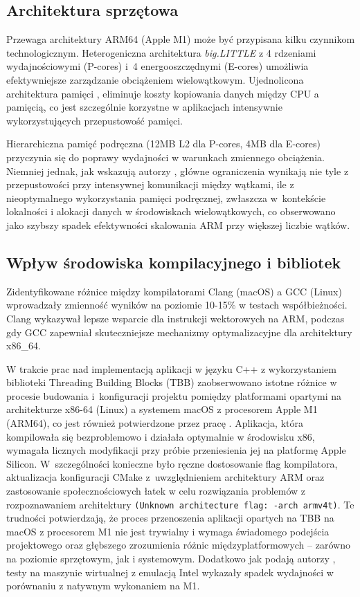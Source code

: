 \subsection{Architektura sprzętowa}

Przewaga architektury ARM64 (Apple M1) może być przypisana kilku czynnikom technologicznym. Heterogeniczna architektura \emph{big.LITTLE} z 4 rdzeniami wydajnościowymi (P-cores) i~4 energooszczędnymi (E-cores) umożliwia efektywniejsze zarządzanie obciążeniem wielowątkowym. Ujednolicona architektura pamięci , eliminuje koszty kopiowania danych między CPU a pamięcią, co jest szczególnie korzystne w aplikacjach intensywnie wykorzystujących przepustowość pamięci.

Hierarchiczna pamięć podręczna (12MB L2 dla P-cores, 4MB dla E-cores) przyczynia się do poprawy wydajności w warunkach zmiennego obciążenia. Niemniej jednak, jak wskazują autorzy \cite{arml2c}, główne ograniczenia wynikają nie tyle z przepustowości przy intensywnej komunikacji między wątkami, ile z nieoptymalnego wykorzystania pamięci podręcznej, zwłaszcza w~kontekście lokalności i alokacji danych w środowiskach wielowątkowych, co obserwowano jako szybszy spadek efektywności skalowania ARM przy większej liczbie wątków.

\subsection{Wpływ środowiska kompilacyjnego i bibliotek}

Zidentyfikowane różnice między kompilatorami Clang (macOS) a GCC (Linux) wprowadzały zmienność wyników na poziomie 10-15\% w testach współbieżności. Clang wykazywał lepsze wsparcie dla instrukcji wektorowych na ARM, podczas gdy GCC zapewniał skuteczniejsze mechanizmy optymalizacyjne dla architektury x86\_64. 

W trakcie prac nad implementacją aplikacji w języku C++ z wykorzystaniem biblioteki Threading Building Blocks (TBB) zaobserwowano istotne różnice w procesie budowania i~konfiguracji projektu pomiędzy platformami opartymi na architekturze x86-64 (Linux) a systemem macOS z procesorem Apple M1 (ARM64), co jest również potwierdzone przez pracę \cite{ARMTBB}. Aplikacja, która kompilowała się bezproblemowo i działała optymalnie w środowisku x86, wymagała licznych modyfikacji przy próbie przeniesienia jej na platformę Apple Silicon. W~szczególności konieczne było ręczne dostosowanie flag kompilatora, aktualizacja konfiguracji CMake z~uwzględnieniem architektury ARM oraz zastosowanie społecznościowych łatek w celu rozwiązania problemów z rozpoznawaniem architektury \texttt{(Unknown architecture flag: \mbox{-arch armv4t)}}. Te trudności potwierdzają, że proces przenoszenia aplikacji opartych na TBB na \mbox{macOS} z procesorem M1 nie jest trywialny i wymaga świadomego podejścia projektowego oraz głębszego zrozumienia różnic międzyplatformowych -- zarówno na poziomie sprzętowym, jak i systemowym. Dodatkowo jak podają autorzy \cite{TBBARMCONCLUSIONS}, testy na maszynie wirtualnej z emulacją Intel wykazały spadek wydajności w porównaniu z natywnym wykonaniem na M1.

